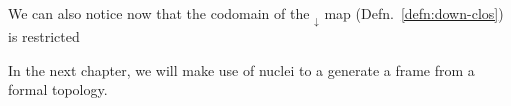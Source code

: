 We can also notice now that the codomain of the $_\downarrow$ map (Defn.~\ref{defn:down-clos}) is
restricted

In the next chapter, we will make use of nuclei to a generate a frame from a formal
topology.











